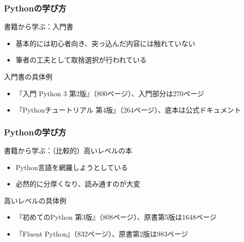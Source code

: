 \documentclass[aspectratio=169,dvipdfmx,12pt,notheorems]{beamer}
\theoremstyle{definition}
\begin{document}
\begin{frame}\frametitle{Pythonの学び方}

\begin{block}{書籍から学ぶ：入門書}
\begin{itemize}
\item 基本的には初心者向き、突っ込んだ内容には触れていない
\item 筆者の工夫として取捨選択が行われている
\end{itemize}
\end{block}

\begin{exampleblock}{入門書の具体例}
\begin{itemize}
\item 『入門 Python 3 第2版』（800ページ）、入門部分は270ページ
\item 『Pythonチュートリアル 第4版』（264ページ）、底本は公式ドキュメント
\end{itemize}
\end{exampleblock}

\end{frame}

\begin{frame}\frametitle{Pythonの学び方}

\begin{block}{書籍から学ぶ：（比較的）高いレベルの本}
\begin{itemize}
\item Python言語を網羅しようとしている
\item 必然的に分厚くなり、読み通すのが大変
\end{itemize}
\end{block}

\begin{exampleblock}{高いレベルの具体例}
\begin{itemize}
\item 『初めてのPython 第3版』（808ページ）、原書第5版は1648ページ
\item 『Fluent Python』（832ページ）、原書第2版は983ページ
\end{itemize}
\end{exampleblock}

\end{frame}
\end{document}
